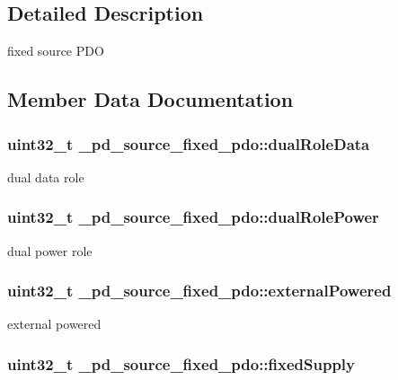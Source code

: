 \subsection{Detailed Description}
fixed source P\-D\-O 

\subsection{Member Data Documentation}
\hypertarget{struct__pd__source__fixed__pdo_a9965da25ad2e4b58fd579e5a0632145a}{
\subsubsection[{dual\-Role\-Data}]{\setlength{\rightskip}{0pt plus 5cm}uint32\-\_\-t \-\_\-pd\-\_\-source\-\_\-fixed\-\_\-pdo\-::dual\-Role\-Data}}\label{struct__pd__source__fixed__pdo_a9965da25ad2e4b58fd579e5a0632145a}
dual data role \hypertarget{struct__pd__source__fixed__pdo_afcce88f5e0b229d32e79297566e80dfd}{
\subsubsection[{dual\-Role\-Power}]{\setlength{\rightskip}{0pt plus 5cm}uint32\-\_\-t \-\_\-pd\-\_\-source\-\_\-fixed\-\_\-pdo\-::dual\-Role\-Power}}\label{struct__pd__source__fixed__pdo_afcce88f5e0b229d32e79297566e80dfd}
dual power role \hypertarget{struct__pd__source__fixed__pdo_aa1715617698b348913227183195ae8f5}{
\subsubsection[{external\-Powered}]{\setlength{\rightskip}{0pt plus 5cm}uint32\-\_\-t \-\_\-pd\-\_\-source\-\_\-fixed\-\_\-pdo\-::external\-Powered}}\label{struct__pd__source__fixed__pdo_aa1715617698b348913227183195ae8f5}
external powered \hypertarget{struct__pd__source__fixed__pdo_a2375dc4363d49f14521f1f7f6adffcde}{
\subsubsection[{fixed\-Supply}]{\setlength{\rightskip}{0pt plus 5cm}uint32\-\_\-t \-\_\-pd\-\_\-source\-\_\-fixed\-\_\-pdo\-::fixed\-Supply}}\label{struct__pd__source__fixed__pdo_a2375dc4363d49f14521f1f7f6adffcde}
